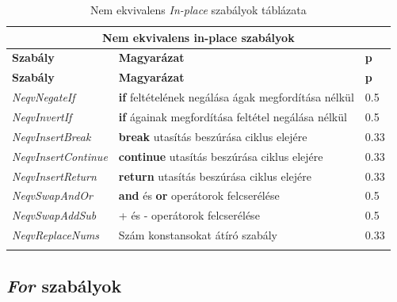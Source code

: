 \begin{center}
	\begin{longtable}{ | p{} | p{} | p{} | }
		\hline
		\multicolumn{3}{|c|}{\textbf{Nem ekvivalens in-place szabályok}}
		\\ \hline
		
		\textbf{Szabály} & \textbf{Magyarázat} & \textbf{p}
		\\ \hline \hline
		\endfirsthead %
		
		\hline
		\textbf{Szabály} & \textbf{Magyarázat} & \textbf{p}
		\\ \hline \hline
		\endhead %
		
		\hline
		\endfoot %
		
		\endlastfoot %
		
		\emph{NeqvNegateIf}
		& \textbf{if} feltételének negálása ágak megfordítása nélkül
		& 0.5
		\\ \hline

		\emph{NeqvInvertIf}
		& \textbf{if} ágainak megfordítása feltétel negálása nélkül
		& 0.5
		\\ \hline

		\emph{NeqvInsertBreak}
		& \textbf{break} utasítás beszúrása ciklus elejére
		& 0.33
		\\ \hline

		\emph{NeqvInsertContinue}
		& \textbf{continue} utasítás beszúrása ciklus elejére
		& 0.33
		\\ \hline

		\emph{NeqvInsertReturn}
		& \textbf{return} utasítás beszúrása ciklus elejére
		& 0.33
		\\ \hline
		
		\emph{NeqvSwapAndOr}
		& \textbf{and} és \textbf{or} operátorok felcserélése
		& 0.5
		\\ \hline

		\emph{NeqvSwapAddSub}
		& + és - operátorok felcserélése
		& 0.5
		\\ \hline

		\emph{NeqvReplaceNums}
		& Szám konstansokat átíró szabály
		& 0.33
		\\ \hline

		\caption{Nem ekvivalens \emph{In-place} szabályok táblázata}
		\label{tab:in-place-rules-neqv}
	\end{longtable}
\end{center}

\subsection{\emph{For} szabályok}


